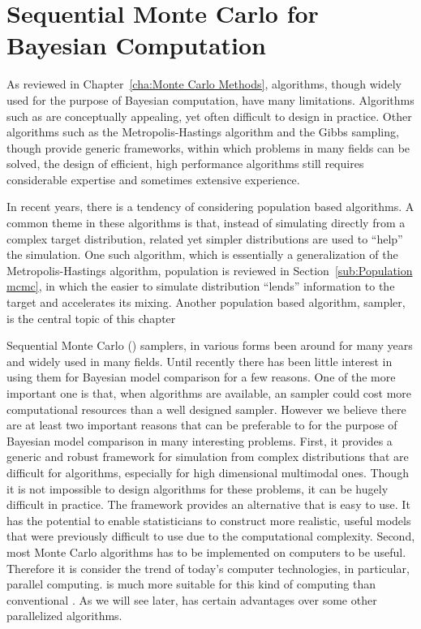\chapter{Sequential Monte Carlo for Bayesian Computation}
\label{cha:Sequential Monte Carlo for Bayesian Computation}

As reviewed in Chapter~\ref{cha:Monte Carlo Methods}, \mcmc algorithms, though widely used for the purpose of Bayesian computation, have many limitations. Algorithms such as \rjmcmc are conceptually appealing, yet often difficult to design in practice. Other algorithms such as the Metropolis-Hastings algorithm and the Gibbs sampling, though provide generic frameworks, within which problems in many fields can be solved, the design of efficient, high performance algorithms still requires considerable expertise and sometimes extensive experience.

In recent years, there is a tendency of considering population based algorithms. A common theme in these algorithms is that, instead of simulating directly from a complex target distribution, related yet simpler distributions are used to ``help'' the simulation. One such algorithm, which is essentially a generalization of the Metropolis-Hastings algorithm, population \mcmc is reviewed in Section~\ref{sub:Population mcmc}, in which the easier to simulate distribution ``lends'' information to the target and accelerates its mixing. Another population based algorithm, \smc sampler, is the central topic of this chapter

Sequential Monte Carlo (\smc) samplers, in various forms  been around for many years and  widely used in many fields. Until recently there has been little interest in using them for Bayesian model comparison for a few reasons. One of the more important one is that, when \mcmc algorithms are available, an \smc sampler could cost more computational resources than a well designed \mcmc sampler. However we believe there are at least two important reasons that \smc can be preferable to \mcmc for the purpose of Bayesian model comparison in many interesting problems. First, it provides a generic and robust framework for simulation from complex distributions that are difficult for \mcmc algorithms, especially for high dimensional multimodal ones. Though it is not impossible to design \mcmc algorithms for these problems, it can be hugely difficult in practice. The \smc framework provides an alternative that is easy to use. It has the potential to enable statisticians to construct more realistic, useful models that were previously difficult to use due to the computational complexity. Second, most Monte Carlo algorithms has to be implemented on computers to be useful. Therefore it is  consider the trend of today's computer technologies, in particular, parallel computing. \smc is much more suitable for this kind of computing than conventional \mcmc. As we will see later, \smc has certain advantages over some other parallelized algorithms.

